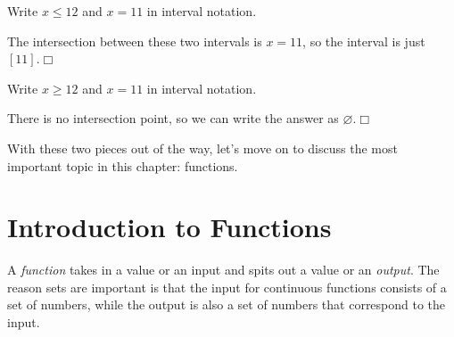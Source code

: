 \documentclass[../book.tex]{subfiles}
\begin{document}
\begin{example}
Write $x\leq 12$ and $x=11$ in interval notation.
\end{example}
\begin{solution}
The intersection between these two intervals is $x=11$, so the interval is just $[11]$.$\Box$
\end{solution}
\begin{example}
Write $x\geq 12$ and $x=11$ in interval notation.
\end{example}
\begin{solution}
There is no intersection point, so we can write the answer as $\varnothing$.$\Box$
\end{solution}
\noindent With these two pieces out of the way, let's move on to discuss the most important topic in this chapter: functions.
\section{Introduction to Functions}
\noindent A \textit{function} takes in a value or an input and spits out a value or an \textit{output}.  The reason sets are important is that the input for continuous functions consists of a set of numbers, while the output is also a set of numbers that correspond to the input.
\end{document}
